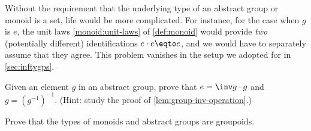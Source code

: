 \begin{remark}\label{rem:ee=e_coherence}
  Without the requirement that the underlying type of an abstract group or monoid 
  is a set, life would be more complicated.  For instance, for the
  case when $g$ is $e$, the unit laws \ref{monoid:unit-laws} of \cref{def:monoid}
  would provide \emph{two} (potentially different)
  identifications $e\cdot e \eqto e$, and we would have to separately 
  assume that they agree.  This problem vanishes in the setup we adopted for
  \inftygps in \cref{sec:inftygps}.
\end{remark}

\begin{xca}\label{xca:left-inv-involution}
  Given an element $g$ in an abstract group,
  prove that $e=\inv g\cdot g$ and $g=(g^{-1})^{-1}$. 
  (Hint: study the proof of \cref{lem:group-inv-operation}.)
\end{xca}

\begin{xca}\label{xca:typemonoidisgroupoid}
  Prove that the types of monoids and abstract groups are groupoids.
\end{xca}

